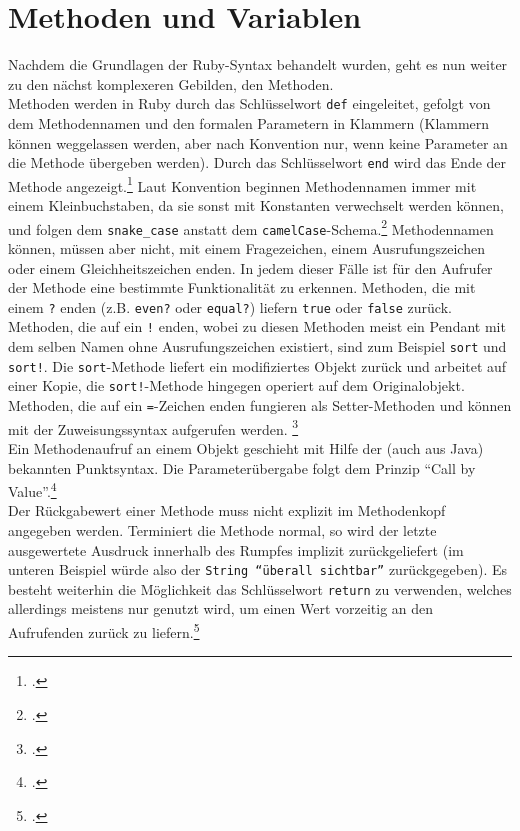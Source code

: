 \documentclass[a4paper, 11pt]{scrreprt}
\begin{document}
\section{Methoden und Variablen}
 Nachdem die Grundlagen der Ruby-Syntax behandelt wurden, geht es nun weiter zu den nächst komplexeren Gebilden, den Methoden.\\
Methoden werden in Ruby durch das Schlüsselwort \texttt{def} eingeleitet, gefolgt von dem Methodennamen und den formalen Parametern in Klammern (Klammern können weggelassen werden, aber nach Konvention nur, wenn keine Parameter an die Methode übergeben werden). Durch das Schlüsselwort \texttt{end} wird das Ende der Methode angezeigt.\footcite[vgl.][S.177]{ruby_lang}
Laut Konvention beginnen Methodennamen immer mit einem Kleinbuchstaben, da sie sonst mit Konstanten verwechselt werden können, und folgen dem \texttt{snake\_case} anstatt dem \texttt{camelCase}-Schema.\footcite[vgl.][S.180]{ruby_lang}
Methodennamen können, müssen aber nicht, mit einem Fragezeichen, einem Ausrufungszeichen oder einem Gleichheitszeichen enden. In jedem dieser Fälle ist für den Aufrufer der Methode eine bestimmte Funktionalität zu erkennen. Methoden, die mit einem \texttt{?} enden (z.B. \texttt{even?} oder \texttt{equal?}) liefern \texttt{true} oder \texttt{false} zurück. Methoden, die auf ein \texttt{!} enden, wobei zu diesen Methoden meist ein Pendant mit dem selben Namen ohne Ausrufungszeichen existiert, sind zum Beispiel \texttt{sort} und \texttt{sort!}. Die \texttt{sort}-Methode liefert ein modifiziertes Objekt zurück und arbeitet auf einer Kopie, die \texttt{sort!}-Methode hingegen operiert auf dem Originalobjekt. Methoden, die auf ein \texttt{=}-Zeichen enden fungieren als Setter-Methoden und können mit der Zuweisungssyntax aufgerufen werden. \footcite[vgl.][S.119-120]{p_ruby}
\\
Ein Methodenaufruf an einem Objekt geschieht mit Hilfe der (auch aus Java) bekannten Punktsyntax. Die Parameterübergabe folgt dem Prinzip ``Call by Value''.\footcite[vgl.][S.122]{p_ruby}\\
Der Rückgabewert einer Methode muss nicht explizit im Methodenkopf angegeben werden. Terminiert die Methode normal, so wird der letzte ausgewertete Ausdruck innerhalb des Rumpfes implizit zurückgeliefert (im unteren Beispiel würde also der \texttt{String ``überall sichtbar''} zurückgegeben). Es besteht weiterhin die Möglichkeit das Schlüsselwort \texttt{return} zu verwenden, welches allerdings meistens nur genutzt wird, um einen Wert vorzeitig an den Aufrufenden zurück zu liefern.\footcite[vgl.][S.177-178]{ruby_lang}
\end{document}
